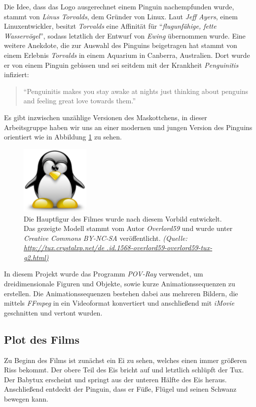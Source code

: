 \documentclass[11pt,parskip]{scrartcl}
\begin{document}
Die Idee, dass das Logo ausgerechnet einem Pinguin nachempfunden wurde, stammt
von \emph{Linus Torvalds}, dem Gründer von Linux. Laut \emph{Jeff Ayers}, einem
Linuxentwickler, besitzt \emph{Torvalds} eine Affinität für
\enquote{\emph{flugunfähige, fette Wasservögel}}, sodass letztlich der Entwurf
von \emph{Ewing} übernommen wurde. Eine weitere Anekdote, die zur Auswahl des
Pinguins beigetragen hat stammt von einem Erlebnis \emph{Torvalds} in einem
Aquarium in Canberra, Australien. Dort wurde er von einem Pinguin gebissen und
sei seitdem mit der Krankheit \emph{Penguinitis} infiziert:

\begin{quote}
  \enquote{Penguinitis makes you stay awake at nights just thinking about
    penguins and feeling great love towards them.} \cite{tuxstory}
\end{quote}

Es gibt inzwischen unzählige Versionen des Maskottchens, in dieser
Arbeitsgruppe haben wir uns an einer modernen und jungen Version des Pinguins
orientiert wie in Abbildung \ref{fig:overlord59tux} zu sehen.
%
\begin{figure}[htbp]
  \centering
  \includegraphics[width=0.3\textwidth]{./fig/overlord59tux.pdf}
  \caption{
    Die Hauptfigur des Filmes wurde nach diesem Vorbild entwickelt. Das
    gezeigte Modell stammt vom Autor \emph{Overlord59} und wurde unter
    \emph{Creative Commons BY-NC-SA} veröffentlicht.
    \emph{
      (Quelle:
      \url{http://tux.crystalxp.net/de
        .id.1568-overlord59-overlord59-tux-g2.html)
      }
    }
  }
  \label{fig:overlord59tux}
\end{figure}
%

In diesem Projekt wurde das Programm \emph{POV-Ray} verwendet, um
dreidimensionale Figuren und Objekte, sowie kurze Animationssequenzen zu
erstellen. Die Animationssequenzen bestehen dabei aus mehreren Bildern, die
mittels \emph{FFmpeg} in ein Videoformat konvertiert und anschließend mit
\emph{iMovie} geschnitten und vertont wurden.


\subsection{Plot des Films}
Zu Beginn des Films ist zunächst ein Ei zu sehen, welches einen immer größeren
Riss bekommt. Der obere Teil des Eis bricht auf und letztlich schlüpft der Tux.
Der Babytux erscheint und springt aus der unteren Hälfte des Eis heraus.
Anschließend entdeckt der Pinguin, dass er Füße, Flügel und seinen Schwanz
bewegen kann.
\end{document}
